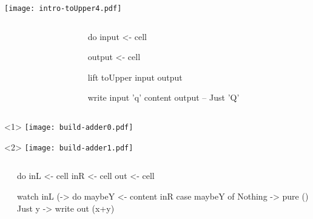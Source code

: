 \documentclass[UKenglish,usenames,dvipsnames,svgnames,table,aspectratio=169,mathserif]{beamer}
\newcommand{\nl}{\vspace{\baselineskip}}
\newcommand{\pnl}{\pause \nl}
\begin{document}
\begin{frame}[fragile]
\centering

\begin{overlayarea}{0.5\textwidth}{0.4\textheight}
\texttt{[image: intro-toUpper4.pdf]}
\end{overlayarea}

\begin{columns}
\begin{column}{0.3\textwidth}
\end{column}
\begin{column}{0.7\textwidth}
\begin{haskellcode}
do
  input  <- cell
\end{haskellcode}
\begin{haskellcode}
  output <- cell
\end{haskellcode}
\begin{haskellcode}
  lift toUpper input output
\end{haskellcode}
\nl
\begin{haskellcode}
  write input 'q'
  content output   -- Just 'Q'
\end{haskellcode}
\end{column}
\end{columns}

\end{frame}


\begin{frame}[fragile]
\centering

\begin{overlayarea}{0.5\textwidth}{0.4\textheight}
\begin{onlyenv}<1>
\texttt{[image: build-adder0.pdf]}
\end{onlyenv}
\begin{onlyenv}<2>
\texttt{[image: build-adder1.pdf]}
\end{onlyenv}
\end{overlayarea}

\begin{columns}
\begin{column}{0.3\textwidth}
\end{column}
\begin{column}{0.7\textwidth}
\begin{haskellcode}
do  inL  <- cell
    inR  <- cell
    out  <- cell
\end{haskellcode}
\pnl
\begin{haskellcode}
  watch inL (\x ->
    do  maybeY <- content inR
        case maybeY of
          Nothing -> pure ()
          Just y  -> write out (x+y)
\end{haskellcode}
\end{column}
\end{columns}
\end{frame}
\end{document}
